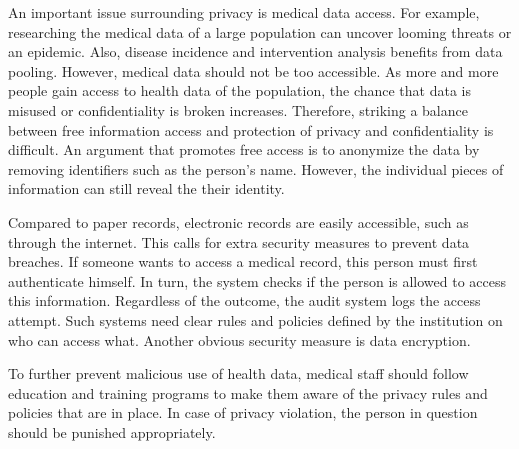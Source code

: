     An important issue surrounding privacy is medical data access. For example, researching the medical data of a large population can uncover looming threats or an epidemic. Also, disease incidence and intervention analysis benefits from data pooling. However, medical data should not be too accessible. As more and more people gain access to health data of the population, the chance that data is misused or confidentiality is broken increases. Therefore, striking a balance between free information access and protection of privacy and confidentiality is difficult. An argument that promotes free access is to anonymize the data by removing identifiers such as the person's name. However, the individual pieces of information can still reveal the their identity.

    Compared to paper records, electronic records are easily accessible, such as through the internet. This calls for extra security measures to prevent data breaches. If someone wants to access a medical record, this person must first authenticate himself. In turn, the system checks if the person is allowed to access this information. Regardless of the outcome, the audit system logs the access attempt. Such systems need clear rules and policies defined by the institution on who can access what. Another obvious security measure is data encryption.

    To further prevent malicious use of health data, medical staff should follow education and training programs to make them aware of the privacy rules and policies that are in place. In case of privacy violation, the person in question should be punished appropriately.